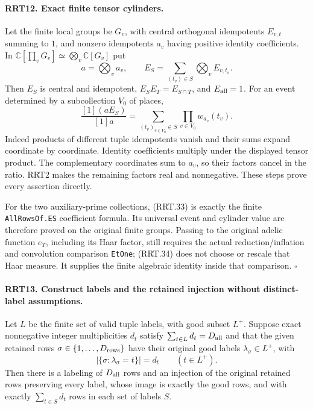\paragraph{RRT12. Exact finite tensor cylinders.}
\label{claim:RRT12}
Let the finite local groups be $G_v$, with central orthogonal
idempotents $E_{v,t}$ summing to $1$, and nonzero idempotents
$a_v$ having positive identity coefficients.  In
$\mathbb C[\prod_vG_v]\simeq\bigotimes_v\mathbb C[G_v]$ put
\[
 a=\bigotimes_va_v,\qquad
 E_S=\sum_{(t_v)\in S}\bigotimes_vE_{v,t_v}.
 \tag{RRT.33}
\]
Then $E_S$ is central and idempotent,
$E_SE_T=E_{S\cap T}$, and $E_{\rm all}=1$.
For an event determined by a subcollection $V_0$ of places,
\[
 \frac{[1](aE_S)}{[1]a}
          =\sum_{(t_v)_{v\in V_0}\in S}
                   \prod_{v\in V_0}w_{a_v}(t_v).
 \tag{RRT.34}
\]
Indeed products of different tuple idempotents vanish and
their sums expand coordinate by coordinate.  Identity
coefficients multiply under the displayed tensor product.
The complementary coordinates sum to $a_v$, so their factors
cancel in the ratio.  RRT2 makes the remaining factors real
and nonnegative.  These steps prove every assertion directly.

For the two auxiliary-prime collections, (RRT.33) is exactly
the finite \texttt{AllRowsOf.ES} coefficient formula.  Its
universal event and cylinder value are therefore proved on
the original finite groups.  Passing to the original adelic
function $e_T$, including its Haar factor, still requires the
actual reduction/inflation and convolution comparison
\texttt{EtOne}; (RRT.34) does not choose or rescale that Haar
measure.  It supplies the finite algebraic identity inside
that comparison.
\hfill$\square$

\paragraph{RRT13. Construct labels and the retained injection without distinct-label assumptions.}
\label{claim:RRT13}
Let $L$ be the finite set of valid tuple labels, with good
subset $L^+$.  Suppose exact nonnegative integer multiplicities
$d_t$ satisfy $\sum_{t\in L}d_t=D_{\rm all}$ and that the
given retained rows $\sigma\in\{1,\ldots,D_{\rm rows}\}$ have
their original good labels $\lambda_\sigma\in L^+$, with
\[
       |\{\sigma:\lambda_\sigma=t\}|=d_t\qquad(t\in L^+).
 \tag{RRT.35}
\]
Then there is a labeling of $D_{\rm all}$ rows and an
injection of the original retained rows preserving every
label, whose image is exactly the good rows, and with exactly
$\sum_{t\in S}d_t$ rows in each set of labels $S$.


